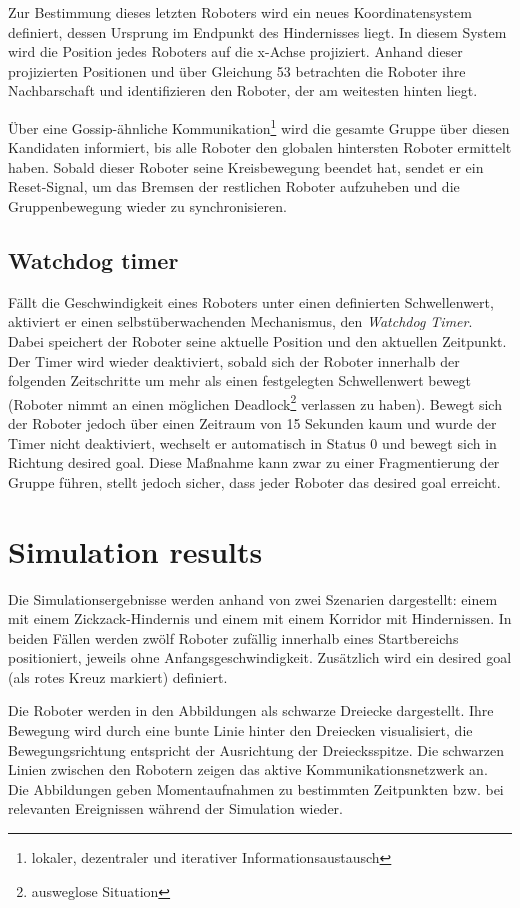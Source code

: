 \documentclass[conference]{IEEEtran}
\begin{document}
Zur Bestimmung dieses letzten Roboters wird ein neues Koordinatensystem definiert, 
dessen Ursprung im Endpunkt des Hindernisses liegt. In diesem System wird die 
Position jedes Roboters auf die x-Achse projiziert. Anhand dieser projizierten 
Positionen und über Gleichung 53 betrachten die Roboter ihre Nachbarschaft und 
identifizieren den Roboter, der am weitesten hinten liegt.

Über eine Gossip-ähnliche 
Kommunikation\footnote{lokaler, dezentraler und iterativer Informationsaustausch}
wird die gesamte Gruppe über diesen Kandidaten informiert, 
bis alle Roboter den globalen hintersten Roboter ermittelt haben. Sobald 
dieser Roboter seine Kreisbewegung beendet hat, sendet er ein Reset-Signal, 
um das Bremsen der restlichen Roboter aufzuheben und die Gruppenbewegung 
wieder zu synchronisieren.

\subsection*{Watchdog timer}
Fällt die Geschwindigkeit eines Roboters unter einen definierten Schwellenwert, 
aktiviert er einen selbstüberwachenden Mechanismus, den \textit{Watchdog Timer}. 
Dabei speichert der Roboter seine aktuelle Position und den aktuellen Zeitpunkt. 
Der Timer wird wieder deaktiviert, sobald sich der Roboter innerhalb der 
folgenden Zeitschritte um mehr als einen festgelegten Schwellenwert bewegt 
(Roboter nimmt an einen möglichen Deadlock\footnote{ausweglose Situation} verlassen zu haben). 
Bewegt sich der Roboter jedoch über einen Zeitraum von 15 Sekunden kaum 
und wurde der Timer nicht deaktiviert, wechselt er automatisch in Status 0 
und bewegt sich in Richtung desired goal. Diese Maßnahme kann zwar zu einer 
Fragmentierung der Gruppe führen, stellt jedoch sicher, dass jeder Roboter 
das desired goal erreicht.


\section{Simulation results}
Die Simulationsergebnisse werden anhand von zwei Szenarien dargestellt: 
einem mit einem Zickzack-Hindernis und einem mit einem Korridor mit Hindernissen. 
In beiden Fällen werden zwölf Roboter zufällig 
innerhalb eines Startbereichs positioniert, jeweils ohne Anfangsgeschwindigkeit. 
Zusätzlich wird ein desired goal (als rotes Kreuz markiert) definiert.

Die Roboter werden in den Abbildungen als schwarze Dreiecke dargestellt. 
Ihre Bewegung wird durch eine bunte Linie hinter den Dreiecken visualisiert, 
die Bewegungsrichtung entspricht der Ausrichtung der Dreiecksspitze. Die schwarzen 
Linien zwischen den Robotern zeigen das aktive Kommunikationsnetzwerk an. 
Die Abbildungen geben Momentaufnahmen zu bestimmten Zeitpunkten bzw. 
bei relevanten Ereignissen während der Simulation wieder.
\end{document}
